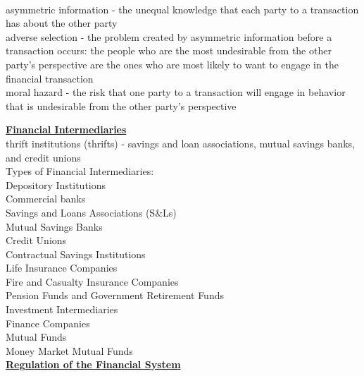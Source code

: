 \documentclass[12pt]{article}
\begin{document}
\\

\noindent asymmetric information - the unequal knowledge that each party to a transaction has about the other party\\

\noindent adverse selection - the problem created by asymmetric information before a transaction occurs: the people who are the most undesirable from the 
other party's perspective are the ones who are most likely to want to engage in the financial transaction\\

\noindent moral hazard - the risk that one party to a transaction will engage in behavior that is undesirable from the other party's perspective\\

\newpage

\noindent \underline{\bf Financial Intermediaries}\\

\noindent thrift institutions (thrifts) - savings and loan associations, mutual savings banks, and credit unions\\

\noindent Types of Financial Intermediaries:\\

\noindent Depository Institutions\\
\indent Commercial banks\\
\indent Savings and Loans Associations (S$\&$Ls)\\
\indent Mutual Savings Banks\\
\indent Credit Unions\\

\noindent Contractual  Savings Institutions\\
\indent Life Insurance Companies\\
\indent Fire and Casualty Insurance Companies\\
\indent Pension Funds and Government Retirement Funds\\

\noindent Investment  Intermediaries\\
\indent Finance Companies\\
\indent Mutual Funds\\
\indent Money Market Mutual Funds\\

\noindent \underline{\bf Regulation of the Financial System}\\
\end{document}
